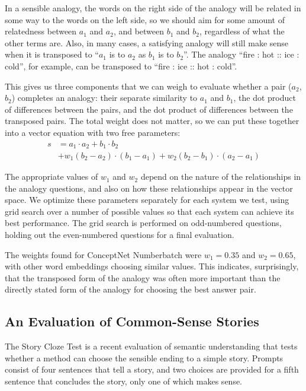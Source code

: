 \documentclass[letterpaper]{article}
\begin{document}
In a sensible analogy, the words on the right side of the analogy will be
related in some way to the words on the left side, so we should aim for some
amount of relatedness between $a_1$ and $a_2$, and between $b_1$ and $b_2$,
regardless of what the other terms are. Also, in many cases, a satisfying
analogy will still make sense when it is transposed to ``$a_1$ is to $a_2$ as
$b_1$ is to $b_2$''. The analogy ``fire : hot :: ice : cold'', for example, can
be transposed to ``fire : ice :: hot : cold''.

This gives us three components that we can weigh to evaluate whether a pair
($a_2$, $b_2$) completes an analogy: their separate similarity to $a_1$ and
$b_1$, the dot product of differences between the pairs, and the dot product of
differences between the transposed pairs.  The total weight does not matter, so
we can put these together into a vector equation with two free parameters:
\begin{equation*}
    \begin{split}
        s &= a_1 \cdot a_2 + b_1 \cdot b_2\\
          &  + w_1(b_2 - a_2) \cdot (b_1 - a_1)
             + w_2(b_2 - b_1) \cdot (a_2 - a_1)
    \end{split}
\end{equation*}

The appropriate values of $w_1$ and $w_2$ depend on the nature of the
relationships in the analogy questions, and also on how these relationships
appear in the vector space. We optimize these parameters separately for each
system we test, using grid search over a number of possible values so that each
system can achieve its best performance. The grid search is performed on
odd-numbered questions, holding out the even-numbered questions for a final
evaluation.

The weights found for ConceptNet Numberbatch were $w_1 = 0.35$ and $w_2 =
0.65$, with other word embeddings choosing similar values. This indicates,
surprisingly, that the transposed form of the analogy was often more important
than the directly stated form of the analogy for choosing the best answer pair.

\subsection{An Evaluation of Common-Sense Stories}
\label{story-evaluation}

The Story Cloze Test \cite{mostafazadeh2016cloze} is a recent evaluation of
semantic understanding that tests whether a method can choose the sensible
ending to a simple story. Prompts consist of four sentences that tell a story,
and two choices are provided for a fifth sentence that concludes the story,
only one of which makes sense.
\end{document}
